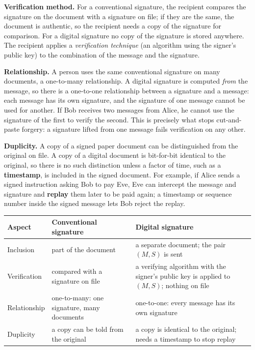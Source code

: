 \textbf{Verification method.} For a conventional signature, the recipient compares the signature on the document with a signature on file; if they are the same, the document is authentic, so the recipient needs a copy of the signature for comparison. For a digital signature no copy of the signature is stored anywhere. The recipient applies a \emph{verification technique} (an algorithm using the signer's public key) to the combination of the message and the signature.

\textbf{Relationship.} A person uses the same conventional signature on many documents, a one-to-many relationship. A digital signature is computed \emph{from} the message, so there is a one-to-one relationship between a signature and a message: each message has its own signature, and the signature of one message cannot be used for another. If Bob receives two messages from Alice, he cannot use the signature of the first to verify the second. This is precisely what stops cut-and-paste forgery: a signature lifted from one message fails verification on any other.

\textbf{Duplicity.} A copy of a signed paper document can be distinguished from the original on file. A copy of a digital document is bit-for-bit identical to the original, so there is no such distinction unless a factor of time, such as a \textbf{timestamp}, is included in the signed document. For example, if Alice sends a signed instruction asking Bob to pay Eve, Eve can intercept the message and signature and \textbf{replay} them later to be paid again; a timestamp or sequence number inside the signed message lets Bob reject the replay.

\begin{center}\small
\begin{tabularx}{\textwidth}{@{}l X X@{}}
\toprule
Aspect & Conventional signature & Digital signature\\
\midrule
Inclusion & part of the document & a separate document; the pair $(M, S)$ is sent\\
Verification & compared with a signature on file & a verifying algorithm with the signer's public key is applied to $(M, S)$; nothing on file\\
Relationship & one-to-many: one signature, many documents & one-to-one: every message has its own signature\\
Duplicity & a copy can be told from the original & a copy is identical to the original; needs a timestamp to stop replay\\
\bottomrule
\end{tabularx}
\end{center}

